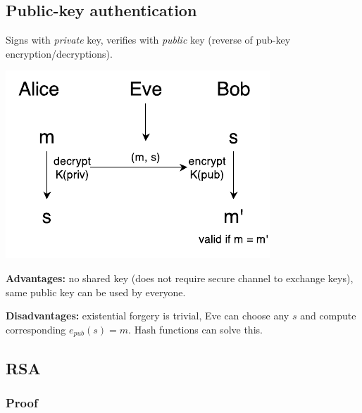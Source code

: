 \subsection{Public-key authentication}
Signs with \emph{private} key, verifies with \emph{public} key (reverse of pub-key encryption/decryptions).

\begin{center}
\includegraphics{images/2-pub-AB.pdf}
\end{center}

\textbf{Advantages:} no shared key (does not require secure channel to exchange keys), same public key can be used by everyone.

\textbf{Disadvantages:} existential forgery is trivial, Eve can choose any $s$ and compute corresponding $e_{pub}(s) = m$. Hash functions can solve this.

\subsection{RSA}


\subsubsection*{Proof}

